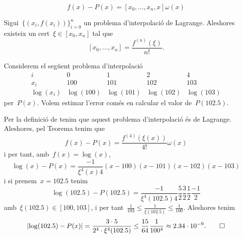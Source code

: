 \documentclass[../metodes-numerics.tex]{subfiles}
\begin{document}
    \begin{observation}
        \[
            f(x)-P(x)=[x_{0},\dots,x_{n},x]\omega(x)
        \]
    \end{observation}
    \begin{corollary}
        Sigui~\(\{(x_{i},f(x_{i}))\}_{i=0}^{n}\) un problema d'interpolació de Lagrange.
        Aleshores existeix un cert~\(\xi\in[x_{0},x_{n}]\) tal que
        \[
            [x_{0},\dots,x_{n}]=\frac{f^{(n)}(\xi)}{n!}.
        \]
    \end{corollary}
    \begin{example}
        Considerem el següent problema d'interpolació
        \[\begin{array}{c|rrrr}
        i & 0 & 1 & 2 & 4\\\hline
        x_{i} & 100 & 101 & 102 & 103\\
        \log(x_{i}) & \log(100) & \log(101) & \log(102) & \log(103)
        \end{array}\]
        per~\(P(x)\).
        Volem estimar l'error comés en calcular el valor de~\(P(102.5)\).
    \end{example}
    \begin{solution}
        Per la definició de  tenim que aquest problema d'interpolació és de Lagrange.
        Aleshores, pel Teorema  tenim que
        \[
            f(x)-P(x)=\frac{f^{(4)}(\xi(x))}{4!}\omega(x)
        \]
        i per tant, amb~\(f(x)=\log(x)\),
        \[
            \log(x)-P(x)=\frac{-1}{\xi^{4}(x)4}(x-100)(x-101)(x-102)(x-103)
        \]
        i si prenem~\(x=102.5\) tenim
        \[
            \log(102.5)-P(102.5)=\frac{-1}{\xi^{4}(102.5)4}\frac{5}{2}\frac{3}{2}\frac{1}{2}\frac{-1}{2}
        \]
        amb~\(\xi(102.5)\in[100,103]\), i per tant~\(\frac{1}{103}\leq\frac{1}{\xi(102.5)}\leq\frac{1}{100}\).
        Aleshores tenim
        \[
            \abs{\log(102.5)-P(x)}=\frac{3\cdot5}{2^{4}\cdot\xi^{4}(102.5)}\leq\frac{15}{64}\frac{1}{100^{4}}\approx2.34\cdot10^{-9}.\qedhere
        \]
    \end{solution}
\end{document}
